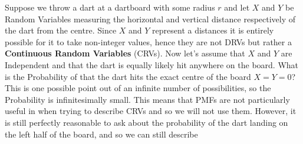 \documentclass{report}
\begin{document}
Suppose we throw a dart at a dartboard with some radius $r$ and let $X$ and $Y$ be Random Variables measuring the horizontal and vertical distance respectively of the dart from the centre. Since $X$ and $Y$ represent a distances it is entirely possible for it to take non-integer values, hence they are not DRVs but rather a \textbf{Continuous Random Variables} (CRVs). Now let's assume that $X$ and $Y$ are Independent and that the dart is equally likely hit anywhere on the board. What is the Probability of that the dart hits the exact centre of the board $X=Y=0$? This is one possible point out of an infinite number of possibilities, so the Probability is infinitesimally small. This means that PMFs are not particularly useful in when trying to describe CRVs and so we will not use them. However, it is still perfectly reasonable to ask about the probability of the dart landing on the left half of the board, and so we can still describe 
\end{document}
